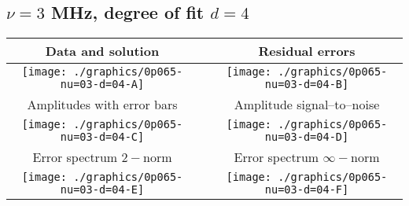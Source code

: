 

% 

\clearpage{}
\break{}

\subsection{$\nu = 3$ MHz, degree of fit $d = 4$}

\begin{table}[h]
    \begin{center}
        \begin{tabular}{ccc}
            Data and solution & \quad & Residual errors \\\hline
            \texttt{[image: ./graphics/0p065-nu=03-d=04-A]} &&
            \texttt{[image: ./graphics/0p065-nu=03-d=04-B]} \\[15pt]
            Amplitudes with error bars && Amplitude signal--to--noise \\\hline
            \texttt{[image: ./graphics/0p065-nu=03-d=04-C]} &&
            \texttt{[image: ./graphics/0p065-nu=03-d=04-D]} \\[15pt]
            Error spectrum $2-$norm && Error spectrum $\infty-$norm \\\hline
            \texttt{[image: ./graphics/0p065-nu=03-d=04-E]} &&
            \texttt{[image: ./graphics/0p065-nu=03-d=04-F]} \\[15pt]
        \end{tabular}
    \end{center}
\label{fig:elev=65, nu=3}
\end{table}



\endinput
